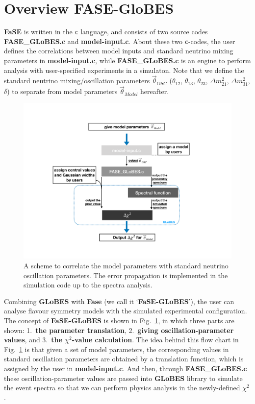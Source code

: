 \documentclass[aps,prd,nofootinbib,preprint]{revtex4}
\begin{document}
\section{Overview FASE-GloBES}\label{sec:overview}

\textbf{FaSE} is written in the \texttt{c} language, and consists of two source codes \textbf{FASE\_GLoBES.c} and \textbf{model-input.c}. About these two \texttt{c}-codes, the user defines the correlations between model inputs and standard neutrino mixing parameters in \textbf{model-input.c}, while \textbf{FASE\_GLoBES.c} is an engine to perform analysis with user-specified experiments in a simulaton. Note that we define the standard neutrino mixing/oscillation parameters $\vec{\theta}_{OSC}$ ($\theta_{12}$, $\theta_{13}$, $\theta_{23}$, $\Delta m_{21}^2$, $\Delta m_{31}^2$, $\delta$) to separate from model parameters $\vec{\theta}_{Model}$ hereafter. 
\begin{figure}[!h]%
\centering
\includegraphics[width=7.5in]{Figs/FASE-chart_1_2.pdf}
\caption{A scheme to correlate the model parameters with standard neutrino oscillation parameters. The error propagation is implemented in the simulation code up to the spectra analysis.}%
\label{fig:FASE}
\end{figure}

{\color{blue}Combining \textbf{GLoBES} with \textbf{Fase} (we call it `\textbf{FaSE-GLoBES}'),  the user can analyse flavour symmetry models with the simulated experimental configuration.} The concept of \textbf{FaSE-GLoBES} is shown in Fig.~\ref{fig:FASE}, in which three parts are shown: 1.~\textbf{the parameter translation}, 2.~\textbf{giving oscillation-parameter values}, and 3.~\textbf{the $\chi^2$-value calculation}. 
The idea behind this flow chart in Fig.~\ref{fig:FASE} is that given a set of model parameters, the corresponding values in standard oscillation parameters are obtained by a translation function, which is assigned by the user in \textbf{model-input.c}. And then, through \textbf{FASE\_GLoBES.c} these oscillation-parameter values are passed into \textbf{GLoBES} library to simulate the event spectra so that we can perform physics analysis in the newly-defined $\chi^2$. 
\end{document}
